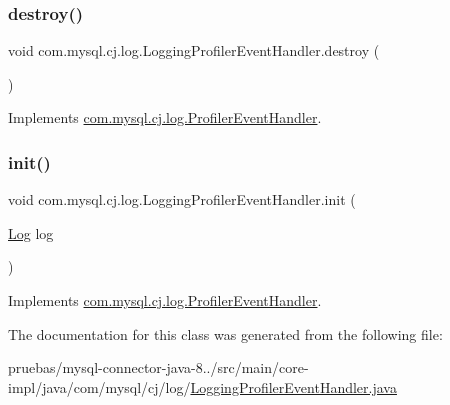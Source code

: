 \subsubsection{\texorpdfstring{destroy()}{destroy()}}
{\footnotesize\ttfamily void com.\+mysql.\+cj.\+log.\+Logging\+Profiler\+Event\+Handler.\+destroy (\begin{DoxyParamCaption}{ }\end{DoxyParamCaption})}



Implements \mbox{\hyperlink{interfacecom_1_1mysql_1_1cj_1_1log_1_1_profiler_event_handler_a16c177c9284c3767ba723f61946a8632}{com.\+mysql.\+cj.\+log.\+Profiler\+Event\+Handler}}.

\mbox{\label{classcom_1_1mysql_1_1cj_1_1log_1_1_logging_profiler_event_handler_a3940fb93810bc25e656b2080b7346b84}} 
\subsubsection{\texorpdfstring{init()}{init()}}
{\footnotesize\ttfamily void com.\+mysql.\+cj.\+log.\+Logging\+Profiler\+Event\+Handler.\+init (\begin{DoxyParamCaption}\item[{\mbox{\hyperlink{interfacecom_1_1mysql_1_1cj_1_1log_1_1_log}{Log}}}]{log }\end{DoxyParamCaption})}



Implements \mbox{\hyperlink{interfacecom_1_1mysql_1_1cj_1_1log_1_1_profiler_event_handler_a09601bf613bfb6c51735f6bcbc15ebc7}{com.\+mysql.\+cj.\+log.\+Profiler\+Event\+Handler}}.



The documentation for this class was generated from the following file\+:\begin{DoxyCompactItemize}
\item 
pruebas/mysql-\/connector-\/java-\/8../src/main/core-\/impl/java/com/mysql/cj/log/\mbox{\hyperlink{_logging_profiler_event_handler_8java}{Logging\+Profiler\+Event\+Handler.\+java}}\end{DoxyCompactItemize}
